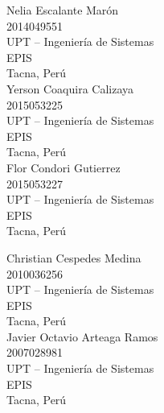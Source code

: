 \documentclass[11pt,a4paper]{article}
\begin{document}
	\begin{multicols}{2}
		\small
		\begin{center}
			Nelia Escalante Marón\\
			2014049551\\
			UPT – Ingeniería de Sistemas\\
			EPIS\\
			Tacna, Perú\\
			\vspace{\baselineskip}
			Yerson Coaquira Calizaya\\
			2015053225\\
			UPT – Ingeniería de Sistemas\\  
			EPIS\\
			Tacna, Perú\\                 
			\vspace{\baselineskip}
			Flor Condori Gutierrez\\
			2015053227\\
			UPT – Ingeniería de Sistemas\\  
			EPIS\\	
			Tacna, Perú\\                 
			\columnbreak
			
			\vspace{\baselineskip}
			Christian Cespedes Medina\\
			2010036256\\
			UPT – Ingeniería de Sistemas\\  
			EPIS\\	
			Tacna, Perú\\                 
			
			\vspace{\baselineskip}
			Javier Octavio Arteaga Ramos \\
			2007028981\\
			UPT – Ingeniería de Sistemas\\  
			EPIS\\	
			Tacna, Perú\\                 
			
		\end{center}
		\normalsize			
	\end{multicols}
	\vspace{\baselineskip}
	\vspace{\baselineskip}
	\vspace{\baselineskip}
	
\end{document}

